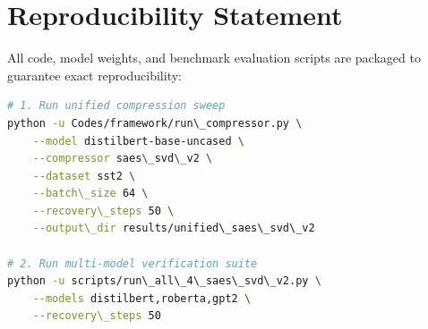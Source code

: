\section{Reproducibility Statement}
All code, model weights, and benchmark evaluation scripts are packaged to guarantee exact reproducibility:
\begin{lstlisting}[language=bash]
# 1. Run unified compression sweep
python -u Codes/framework/run\_compressor.py \
    --model distilbert-base-uncased \
    --compressor saes\_svd\_v2 \
    --dataset sst2 \
    --batch\_size 64 \
    --recovery\_steps 50 \
    --output\_dir results/unified\_saes\_svd\_v2

# 2. Run multi-model verification suite
python -u scripts/run\_all\_4\_saes\_svd\_v2.py \
    --models distilbert,roberta,gpt2 \
    --recovery\_steps 50
\end{lstlisting}
